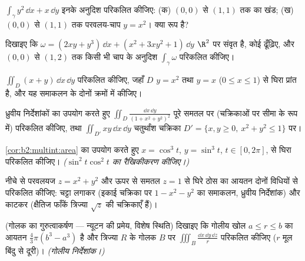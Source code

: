 \begin{exercise}[$\star$]\label{exo:b2:multint:1}
$\int_\gamma y^2\,\dd x + x\,\dd y$ इनके अनुदिश परिकलित कीजिए: (क) $(0,0)$ से $(1,1)$ तक का खंड; (ख) $(0,0)$
से $(1,1)$ तक परवलय-चाप $y = x^2$। क्या रूप  है?
\end{exercise}

\begin{exercise}[$\star$]\label{exo:b2:multint:2}
दिखाइए कि $\omega = (2xy + y^3)\,\dd x + (x^2 + 3xy^2 + 1)\,\dd y$ $\R^2$ पर संवृत है, कोई  ढूँढ़िए, और $(0, 0)$ से $(1, 2)$ तक
किसी भी चाप के अनुदिश $\int_\gamma\omega$ परिकलित कीजिए।
\end{exercise}

\begin{exercise}[$\star$]\label{exo:b2:multint:3}
$\iint_D (x + y)\,\dd x\,\dd y$ परिकलित कीजिए, जहाँ $D$ $y = x^2$ तथा $y = x$ ($0 \leq x \leq 1$) से घिरा प्रांत है,
और यह समाकलन के दोनों क्रमों में कीजिए।
\end{exercise}

\begin{exercise}[$\star\star$]\label{exo:b2:multint:4}
ध्रुवीय निर्देशांकों का उपयोग करते हुए $\iint_D \frac{\dd x\,\dd y}{(1 +
x^2 + y^2)^2}$ पूरे समतल पर (चक्रिकाओं
पर सीमा के रूप में) परिकलित कीजिए, तथा $\iint_{D'} xy\,\dd x\,\dd y$ चतुर्थांश चक्रिका $D' = \{x, y
\geq 0,\ x^2 + y^2 \leq 1\}$
पर।
\end{exercise}

\begin{exercise}[$\star\star$]\label{exo:b2:multint:5}
\cref{cor:b2:multint:area} का उपयोग करते हुए  $x = \cos^3 t$, $y =
\sin^3 t$, $t \in [0, 2\pi]$, से घिरा 
परिकलित कीजिए। \emph{($\sin^2 t\cos^2 t$ का रैखिकीकरण कीजिए।)}
\end{exercise}

\begin{exercise}[$\star\star$]\label{exo:b2:multint:6}
नीचे से परवलयज $z
= x^2 + y^2$ और ऊपर से समतल $z = 1$ से घिरे ठोस का आयतन दोनों
विधियों से परिकलित कीजिए: चट्टा लगाकर (इकाई चक्रिका पर $1 - x^2 - y^2$ का
समाकलन, ध्रुवीय निर्देशांक) और काटकर (क्षैतिज फाँकें त्रिज्या $\sqrt z$
की चक्रिकाएँ हैं)।
\end{exercise}

\begin{exercise}[$\star\star$]\label{exo:b2:multint:7}
(गोलक का गुरुत्वाकर्षण --- न्यूटन की प्रमेय, विशेष स्थिति) दिखाइए
कि गोलीय खोल $a \leq r \leq
b$ का आयतन $\frac43\pi(b^3 - a^3)$ है और त्रिज्या $R$ के गोलक $B$ पर
$\iiint_{B}
\frac{\dd x\,\dd y\,\dd z}{r}$ परिकलित कीजिए ($r$ मूल बिंदु से दूरी)। \emph{(गोलीय
निर्देशांक।)}
\end{exercise}

